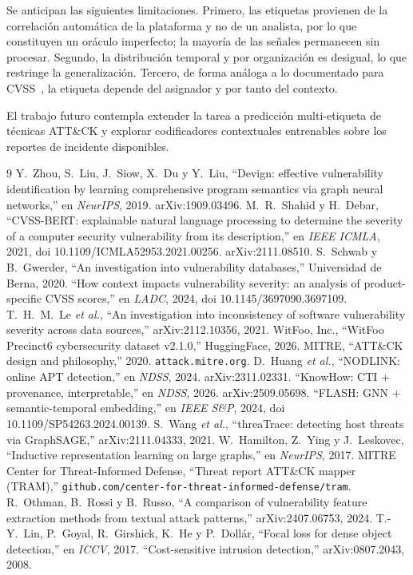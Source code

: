 \documentclass[conference]{IEEEtran}
\begin{document}
Se anticipan las siguientes limitaciones. Primero, las etiquetas provienen de la correlaci\'on autom\'atica de la plataforma y no de un analista, por lo que constituyen un or\'aculo imperfecto; la mayor\'ia de las se\~nales permanecen sin procesar. Segundo, la distribuci\'on temporal y por organizaci\'on es desigual, lo que restringe la generalizaci\'on. Tercero, de forma an\'aloga a lo documentado para CVSS~\cite{schwab,gomes,le}, la etiqueta depende del asignador y por tanto del contexto.

El trabajo futuro contempla extender la tarea a predicci\'on multi-etiqueta de t\'ecnicas ATT\&CK y explorar codificadores contextuales entrenables sobre los reportes de incidente disponibles.

\begin{thebibliography}{9}
 Y.~Zhou, S.~Liu, J.~Siow, X.~Du y Y.~Liu, ``Devign: effective vulnerability identification by learning comprehensive program semantics via graph neural networks,'' en \emph{NeurIPS}, 2019. arXiv:1909.03496.
 M.~R.~Shahid y H.~Debar, ``CVSS-BERT: explainable natural language processing to determine the severity of a computer security vulnerability from its description,'' en \emph{IEEE ICMLA}, 2021, doi 10.1109/ICMLA52953.2021.00256. arXiv:2111.08510.
 S.~Schwab y B.~Gwerder, ``An investigation into vulnerability databases,'' Universidad de Berna, 2020.
 ``How context impacts vulnerability severity: an analysis of product-specific CVSS scores,'' en \emph{LADC}, 2024, doi 10.1145/3697090.3697109.
 T.~H.~M.~Le \emph{et al.}, ``An investigation into inconsistency of software vulnerability severity across data sources,'' arXiv:2112.10356, 2021.
 WitFoo, Inc., ``WitFoo Precinct6 cybersecurity dataset v2.1.0,'' HuggingFace, 2026.
 MITRE, ``ATT\&CK design and philosophy,'' 2020. \texttt{attack.mitre.org}.
 D.~Huang \emph{et al.}, ``NODLINK: online APT detection,'' en \emph{NDSS}, 2024. arXiv:2311.02331.
 ``KnowHow: CTI + provenance, interpretable,'' en \emph{NDSS}, 2026. arXiv:2509.05698.
 ``FLASH: GNN + semantic-temporal embedding,'' en \emph{IEEE S\&P}, 2024, doi 10.1109/SP54263.2024.00139.
 S.~Wang \emph{et al.}, ``threaTrace: detecting host threats via GraphSAGE,'' arXiv:2111.04333, 2021.
 W.~Hamilton, Z.~Ying y J.~Leskovec, ``Inductive representation learning on large graphs,'' en \emph{NeurIPS}, 2017.
 MITRE Center for Threat-Informed Defense, ``Threat report ATT\&CK mapper (TRAM),'' \texttt{github.com/center-for-threat-informed-defense/tram}.
 R.~Othman, B.~Rossi y B.~Russo, ``A comparison of vulnerability feature extraction methods from textual attack patterns,'' arXiv:2407.06753, 2024.
 T.-Y.~Lin, P.~Goyal, R.~Girshick, K.~He y P.~Doll\'ar, ``Focal loss for dense object detection,'' en \emph{ICCV}, 2017.
 ``Cost-sensitive intrusion detection,'' arXiv:0807.2043, 2008.
\end{thebibliography}
\end{document}
